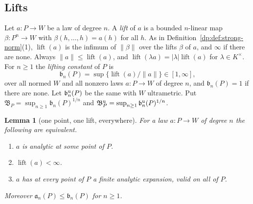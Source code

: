 \documentclass[11pt]{amsart}
\newtheorem{lemma}[theorem]{Lemma}
\theoremstyle{definition}
\theoremstyle{remark}
\numberwithin{equation}{section}
\newcommand{\abs}[1]{\lvert #1\rvert}
\newcommand{\norm}[1]{\lVert #1\rVert}
\theoremstyle{plain}
\theoremstyle{definition}
\theoremstyle{plain}
\begin{document}
\subsection{Lifts}\label{dp:ssec:lifts}

Let $a\colon P\to W$ be a law of degree $n$. A \emph{lift} of $a$ is a bounded $n$\nobreakdash-linear map $\beta\colon P^n\to W$ with $\beta(h,\dots,h)=a(h)$ for all $h$. As in Definition~\ref{dp:def:strong-norm}(1), $\operatorname{lift}(a)$ is the infimum of $\norm\beta$ over the lifts $\beta$ of $a$, and $\infty$ if there are none. Always $\norm a\le\operatorname{lift}(a)$, and $\operatorname{lift}(\lambda a)=\abs\lambda\operatorname{lift}(a)$ for $\lambda\in K^\times$. For $n\ge1$ the \emph{lifting constant} of $P$ is
\[
 \mathfrak b_n(P)=\sup\{\operatorname{lift}(a)/\norm a\}\in[1,\infty],
\]
over all normed $W$ and all nonzero laws $a\colon P\to W$ of degree $n$, and $\mathfrak b_n(P)=1$ if there are none. Let $\mathfrak b^{\rm u}_n(P)$ be the same with $W$ ultrametric. Put $\mathfrak B_P=\sup_{n\ge1}\mathfrak b_n(P)^{1/n}$ and $\mathfrak B^{\rm u}_P=\sup_{n\ge1}\mathfrak b^{\rm u}_n(P)^{1/n}$.

\begin{lemma}[one point, one lift, everywhere]\label{dp:lem:lift-criterion}
For a law $a\colon P\to W$ of degree $n$ the following are equivalent.
\begin{enumerate}
\item[(i)] $a$ is analytic at some point of $P$.
\item[(ii)] $\operatorname{lift}(a)<\infty$.
\item[(iii)] $a$ has at every point of $P$ a finite analytic expansion, valid on all of $P$.
\end{enumerate}
Moreover $\mathfrak a_n(P)\le\mathfrak b_n(P)$ for $n\ge1$.
\end{lemma}
\end{document}

